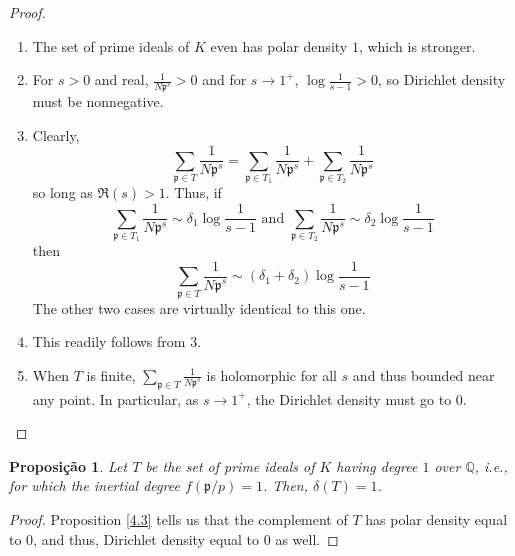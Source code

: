 \documentclass{article}
\newcommand{\QQ}{\mathbb{Q}}
\theoremstyle{plain}
\newtheorem{prop}[thm]{Proposição}
\theoremstyle{definition}
\theoremstyle{remark}
\numberwithin{equation}{section}
\numberwithin{thm}{section}
\begin{document}
\begin{proof}

$ $ \\ \vspace{-0.1cm}

\begin{enumerate}

\item The set of prime ideals of $K$ even has polar density $1$, which is stronger. 

\item For $s > 0$ and real, $\frac{1}{N\mathfrak{p}^{s}} > 0$ and for $s \to 1^{+}$, $\log\frac{1}{s - 1} > 0$, so Dirichlet density must be nonnegative. 

\item Clearly, $$\sum_{\mathfrak{p} \in T} \frac{1}{N\mathfrak{p}^{s}} = \sum_{\mathfrak{p} \in T_1} \frac{1}{N\mathfrak{p}^{s}} + \sum_{\mathfrak{p} \in T_2} \frac{1}{N\mathfrak{p}^{s}}$$ so long as $\Re(s) > 1$. Thus, if $$\sum_{\mathfrak{p} \in T_1} \frac{1}{N\mathfrak{p}^{s}} \sim \delta_{1}\log\frac{1}{s - 1} \text{ and } \sum_{\mathfrak{p} \in T_2} \frac{1}{N\mathfrak{p}^{s}} \sim \delta_{2}\log\frac{1}{s - 1}$$ then $$\sum_{\mathfrak{p} \in T} \frac{1}{N\mathfrak{p}^{s}} \sim (\delta_{1} + \delta_{2})\log\frac{1}{s - 1}$$ The other two cases are virtually identical to this one.

\item This readily follows from 3. 

\item When $T$ is finite, $\sum_{\mathfrak{p} \in T} \frac{1}{N\mathfrak{p}^{s}}$ is holomorphic for all $s$ and thus bounded near any point. In particular, as $s \to 1^{+}$, the Dirichlet density must go to $0$. 

\end{enumerate}

\end{proof}

\begin{prop}
Let $T$ be the set of prime ideals of $K$ having degree $1$ over $\QQ$, i.e., for which the inertial degree $f(\mathfrak{p} / p) = 1$. Then, $\delta(T) = 1$. 
\end{prop}

\begin{proof}
Proposition \ref{4.3} tells us that the complement of $T$ has polar density equal to $0$, and thus, Dirichlet density equal to $0$ as well. 
\end{proof}
\end{document}
